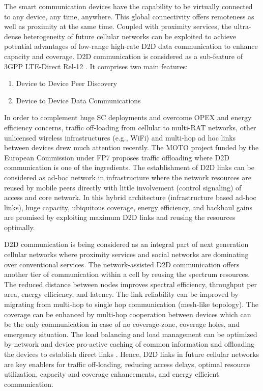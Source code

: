 \documentclass[article,10pt,twocolumn]{IEEEtran}
\begin{document}
The smart communication devices have the capability to be virtually connected to any device, any time, anywhere. This global connectivity offers remoteness as well as proximity at the same time. Coupled with proximity services, the ultra-dense heterogeneity of future cellular networks can be exploited to achieve potential advantages of low-range high-rate D2D data communication to enhance capacity and coverage. D2D communication is considered as a sub-feature of 3GPP  LTE-Direct Rel-12 \citep{balraj_lte_2012}. It comprises two main features:
\begin{enumerate}
\item Device to Device Peer Discovery
\item Device to Device Data Communications
\end{enumerate}

In order to complement huge SC deployments and overcome OPEX and energy efficiency concerns, traffic off-loading from cellular to multi-RAT networks, other unlicensed wireless infrastructures (e.g., WiFi) and multi-hop ad hoc links between devices drew much attention recently. The MOTO project \citep{MOTO} funded by the European Commission under FP7 proposes traffic offloading where D2D communication is one of the ingredients. The establishment of D2D links can be considered as ad-hoc network in infrastructure where the network resources are reused by mobile peers directly with little involvement (control signaling) of access and core network. In this hybrid architecture (infrastructure based ad-hoc links), huge capacity, ubiquitous coverage, energy efficiency, and backhaul gains are promised by exploiting maximum D2D links and reusing the resources optimally.

D2D communication is being considered as an integral part of next generation cellular networks where proximity services and social networks are dominating over conventional services. The network-assisted D2D communication offers another tier of communication within a cell by reusing the spectrum resources. The reduced distance between nodes improves spectral efficiency, throughput per area, energy efficiency, and latency. The link reliability can be improved by migrating from multi-hop to single hop communication (mesh-like topology). The coverage can be enhanced by multi-hop cooperation between devices which can be the only communication in case of no coverage-zone, coverage holes, and emergency situation. The load balancing and load management can be optimized by network and device pro-active caching of common information and offloading the devices to establish direct links \citep{6881261}. Hence, D2D links in future cellular networks are key enablers for traffic off-loading, reducing access delays, optimal resource utilization, capacity and coverage enhancements, and energy efficient communication.
\end{document}
